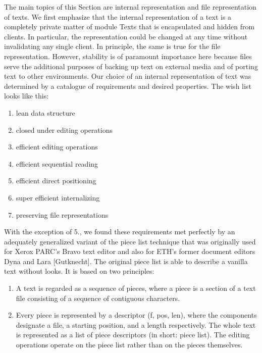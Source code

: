 The main topics of this Section are internal representation and file representation of texts. We first
emphasize that the internal representation of a text is a completely private matter of module Texts
that is encapsulated and hidden from clients. In particular, the representation could be changed at
any time without invalidating any single client. In principle, the same is true for the file
representation. However, stability is of paramount importance here because files serve the
additional purposes of backing up text on external media and of porting text to other environments.
Our choice of an internal representation of text was determined by a catalogue of requirements and
desired properties. The wish list looks like this:
\begin{enumerate}
	\item lean data structure
	\item closed under editing operations
	\item efficient editing operations
	\item efficient sequential reading
	\item efficient direct positioning
	\item super efficient internalizing
	\item preserving file representations
\end{enumerate}
With the exception of 5., we found these requirements met perfectly by an adequately generalized
variant of the piece list technique that was originally used for Xerox PARC's Bravo text editor and
also for ETH's former document editors Dyna and Lara [Gutknecht]. The original piece list is able to
describe a vanilla text without looks. It is based on two principles:
\begin{enumerate}
	\item A text is regarded as a sequence of pieces, where a piece is a section of a text file consisting of
a sequence of contiguous characters.
	\item Every piece is represented by a descriptor (f, pos, len), where the components designate a file,
a starting position, and a length respectively. The whole text is represented as a list of piece
descriptors (in short: piece list). The editing operations operate on the piece list rather than on the
pieces themselves.
\end{enumerate}

